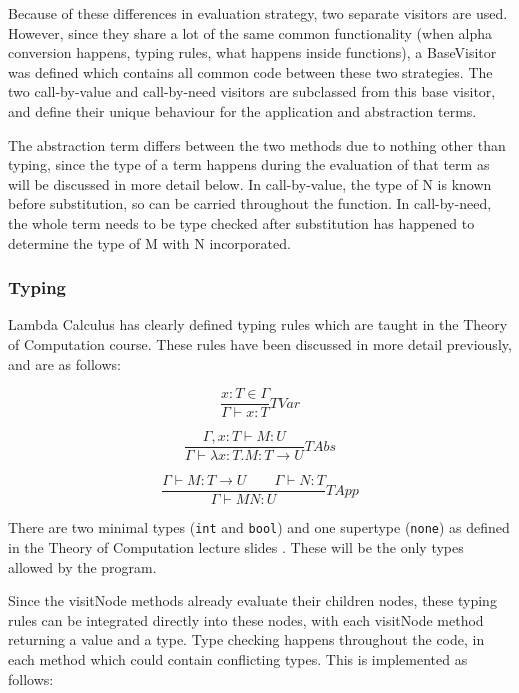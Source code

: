 \documentclass[a4paper,12pt]{report}
\begin{document}
Because of these differences in evaluation strategy, two separate visitors are used. However, since they share a lot of the same common functionality (when alpha conversion happens, typing rules, what happens inside functions), a BaseVisitor was defined which contains all common code between these two strategies. The two call-by-value and call-by-need visitors are subclassed from this base visitor, and define their unique behaviour for the application and abstraction terms.

The abstraction term differs between the two methods due to nothing other than typing, since the type of a term happens during the evaluation of that term as will be discussed in more detail below. In call-by-value, the type of N is known before substitution, so can be carried throughout the function. In call-by-need, the whole term needs to be type checked after substitution has happened to determine the type of M with N incorporated.

\subsubsection{Typing}

Lambda Calculus has clearly defined typing rules which are taught in the Theory of Computation course. These rules have been discussed in more detail previously, and are as follows:

\begin{equation}
\frac{x:T\in \Gamma}{\Gamma \vdash x:T}TVar
\label{variable_type}
\end{equation}

\begin{equation}
\frac{\Gamma ,x:T\vdash M:U}{\Gamma \vdash \lambda x:T.M:T \to U}TAbs
\end{equation}

\begin{equation}
\frac{\Gamma \vdash M:T \to U \qquad \Gamma \vdash N:T}{\Gamma \vdash MN:U}TApp
\label{application_types}
\end{equation}

There are two minimal types (\texttt{int} and \texttt{bool}) and one supertype (\texttt{none}) as defined in the Theory of Computation lecture slides \cite{Gay2019}. These will be the only types allowed by the program.

Since the visitNode methods already evaluate their children nodes, these typing rules can be integrated directly into these nodes, with each visitNode method returning a value and a type. Type checking happens throughout the code, in each method which could contain conflicting types. This is implemented as follows:\\
\end{document}
